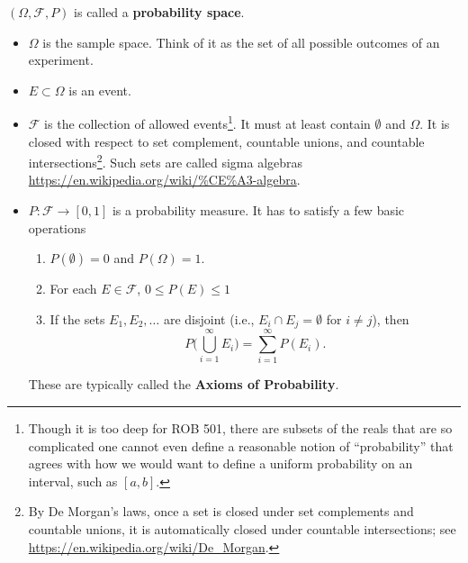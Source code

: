 \begin{definition}
\label{def:ProbSpace}
 $(\Omega, \mathscr{F}, P)$ is called a \textbf{probability space}.
\begin{itemize}
\item $\Omega$ is the sample space. Think of it as the set of all possible outcomes of an experiment. 
\item $E \subset \Omega$ is an event.
\item $\mathscr{F}$ is the collection of allowed events\footnote{Though it is too deep for ROB 501, there are subsets of the reals that are so complicated one cannot even define a reasonable notion of ``probability'' that agrees with how we would want to define a uniform probability on an interval, such as $[a, b]$.}. It must at least contain $\emptyset$ and $\Omega$. It is closed with respect to set complement, countable unions, and countable intersections\footnote{By De Morgan's laws, once a set is closed under set complements and countable unions, it is automatically closed under countable intersections; see \url{https://en.wikipedia.org/wiki/De_Morgan}.}. Such sets are called sigma algebras \url{https://en.wikipedia.org/wiki/%CE%A3-algebra}.
    \item $P:\mathscr{F} \to [0, 1]$ is a probability measure. It has to satisfy a few basic operations
    \begin{enumerate}
    \item $P(\emptyset)=0$ and $P(\Omega)=1$.
    \item For each $E\in \mathscr{F}$, $0 \le P(E) \le 1$
    \item If the sets $E_1, E_2, \ldots $ are disjoint (i.e., $E_i \cap E_j = \emptyset$ for $i \neq j$), then
    $$P\big(\bigcup_{i=1}^{\infty}E_i\big) = \sum_{i=1}^{\infty} P(E_i). $$
    \end{enumerate}
    These are typically called the \textbf{Axioms of Probability}.
    
\end{itemize}
\end{definition}

